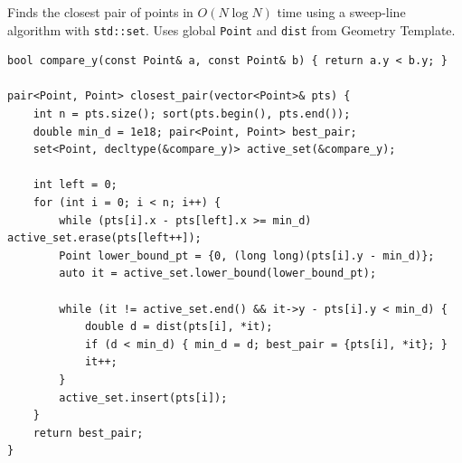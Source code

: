 
Finds the closest pair of points in $O(N \log N)$ time using a sweep-line algorithm with \lstinline|std::set|. Uses global \lstinline|Point| and \lstinline|dist| from Geometry Template.

\begin{lstlisting}
bool compare_y(const Point& a, const Point& b) { return a.y < b.y; }

pair<Point, Point> closest_pair(vector<Point>& pts) {
    int n = pts.size(); sort(pts.begin(), pts.end());
    double min_d = 1e18; pair<Point, Point> best_pair;
    set<Point, decltype(&compare_y)> active_set(&compare_y);
    
    int left = 0;
    for (int i = 0; i < n; i++) {
        while (pts[i].x - pts[left].x >= min_d) active_set.erase(pts[left++]);
        Point lower_bound_pt = {0, (long long)(pts[i].y - min_d)};
        auto it = active_set.lower_bound(lower_bound_pt);
        
        while (it != active_set.end() && it->y - pts[i].y < min_d) {
            double d = dist(pts[i], *it);
            if (d < min_d) { min_d = d; best_pair = {pts[i], *it}; }
            it++;
        }
        active_set.insert(pts[i]);
    }
    return best_pair;
}
\end{lstlisting}
